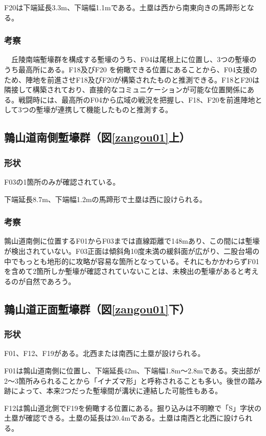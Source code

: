 \documentclass[11pt,report]{jsarticle}
\begin{document}
F20は下端延長3.3m、下端幅1.1mである。土塁は西から南東向きの馬蹄形となる。

\subsubsection*{考察}
　丘陵南端塹壕群を構成する塹壕のうち、F04は尾根上に位置し、3つの塹壕のうち最高所にある。F18及びF20 を俯瞰できる位置にあることから、F04支援のため、陣地を前進させF18及びF20が構築されたものと推測できる。F18とF20は隣接して構築されており、直接的なコミュニケーションが可能な位置関係にある。戦闘時には、最高所のF04から広域の戦況を把握し、F18、F20を前進陣地として3つの塹壕が連携して機能したものと推測する。

\subsection{鶉山道南側塹壕群（図\ref{zangou01}上）}
\subsubsection*{形状}
F03の1箇所のみが確認されている。

下端延長8.7m、下端幅1.2mの馬蹄形で土塁は西に設けられる。

\subsubsection*{考察}
鶉山道南側に位置するF01からF03までは直線距離で148mあり、この間には塹壕が検出されていない。F03正面は傾斜角10度未満の緩斜面が広がり、二股台場の中でもっとも地形的に攻略が容易な箇所となっている。それにもかかわらずF01を含めて2箇所しか塹壕が確認されていないことは、未検出の塹壕があると考えるのが自然であろう。

\subsection{鶉山道正面塹壕群（図\ref{zangou01}下）}
\subsubsection*{形状}
F01、F12、F19がある。北西または南西に土塁が設けられる。

F01は鶉山道南側に位置し、下端延長42m、下端幅1.8m〜2.8mである。突出部が2〜3箇所みられることから「イナズマ形」と呼称されることも多い。後世の踏み跡によって、本来2つだった塹壕間が溝状に連結した可能性もある。

F12は鶉山道北側でF19を俯瞰する位置にある。掘り込みは不明瞭で「S」字状の土塁が確認できる。土塁の延長は20.4mである。土塁は南西と北西に設けられる。
\end{document}
